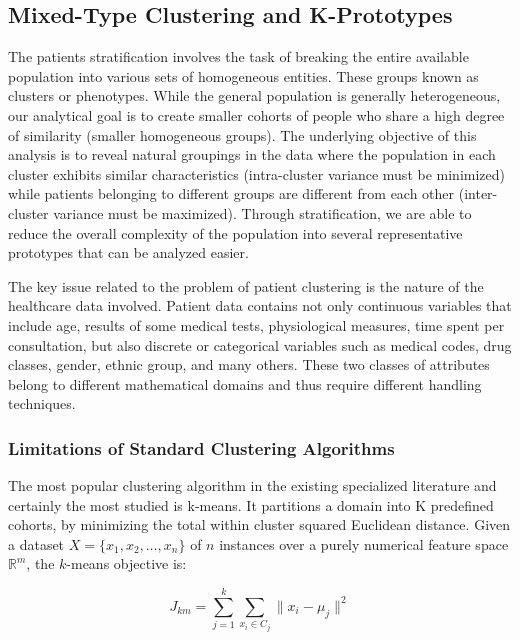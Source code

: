 \subsection{Mixed-Type Clustering and K-Prototypes}

The patients stratification involves the task of breaking the entire available population into various sets of homogeneous entities. These groups known as clusters or phenotypes. While the general population is generally heterogeneous, our analytical goal is to create smaller cohorts of people who share a high degree of similarity (smaller homogeneous groups). The underlying objective of this analysis is to reveal natural groupings in the data where the population in each cluster exhibits similar characteristics (intra-cluster variance must be minimized) while patients belonging to different groups are different from each other (inter-cluster variance must be maximized). Through stratification, we are able to reduce the overall complexity of the population into several representative prototypes that can be analyzed easier.

The key issue related to the problem of patient clustering is the nature of the healthcare data involved. Patient data contains not only continuous variables that include age, results of some medical tests, physiological measures, time spent per consultation, but also discrete or categorical variables such as medical codes, drug classes, gender, ethnic group, and many others. These two classes of attributes belong to different mathematical domains and thus require different handling techniques.

\subsubsection{Limitations of Standard Clustering Algorithms}

The most popular clustering algorithm in the existing specialized literature and certainly the most studied is k-means. It partitions a domain into K predefined cohorts, by minimizing the total within cluster squared Euclidean distance. Given a dataset $X = \{x_1, x_2, \ldots, x_n\}$ of $n$ instances over a purely numerical feature space $\mathbb{R}^m$, the $k$-means objective is:

\begin{equation}
    J_{km} = \sum_{j=1}^{k} \sum_{x_i \in C_j} \|x_i - \mu_j\|^2
    \label{eq:kmeans}
\end{equation}

